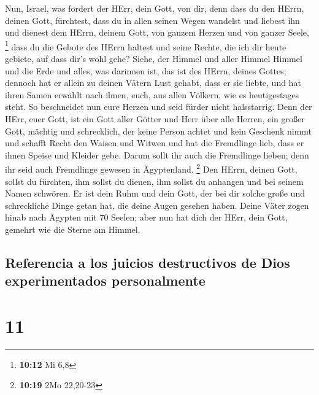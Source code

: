  Nun, Israel, was fordert der HErr, dein Gott, von dir,
denn dass du den HErrn, deinen Gott, fürchtest, dass du in allen seinen
Wegen wandelst und liebest ihn und dienest dem HErrn, deinem Gott, von
ganzem Herzen und von ganzer Seele, \footnote{\textbf{10:12} Mi 6,8}
 dass du die Gebote des HErrn haltest und seine Rechte,
die ich dir heute gebiete, auf dass dir's wohl gehe? 
Siehe, der Himmel und aller Himmel Himmel und die Erde und alles, was
darinnen ist, das ist des HErrn, deines Gottes;  dennoch
hat er allein zu deinen Vätern Lust gehabt, dass er sie liebte, und hat
ihren Samen erwählt nach ihnen, euch, aus allen Völkern, wie es
heutigestages steht.  So beschneidet nun eure Herzen und
seid fürder nicht halsstarrig.  Denn der HErr, euer Gott,
ist ein Gott aller Götter und Herr über alle Herren, ein großer Gott,
mächtig und schrecklich, der keine Person achtet und kein Geschenk nimmt
 und schafft Recht den Waisen und Witwen und hat die
Fremdlinge lieb, dass er ihnen Speise und Kleider gebe. 
Darum sollt ihr auch die Fremdlinge lieben; denn ihr seid auch
Fremdlinge gewesen in Ägyptenland. \footnote{\textbf{10:19} 2Mo 22,20-23}
 Den HErrn, deinen Gott, sollst du fürchten, ihm sollst
du dienen, ihm sollst du anhangen und bei seinem Namen schwören.
 Er ist dein Ruhm und dein Gott, der bei dir solche große
und schreckliche Dinge getan hat, die deine Augen gesehen haben.
 Deine Väter zogen hinab nach Ägypten mit 70 Seelen; aber
nun hat dich der HErr, dein Gott, gemehrt wie die Sterne am Himmel.

\hypertarget{referencia-a-los-juicios-destructivos-de-dios-experimentados-personalmente}{%
\subsection{Referencia a los juicios destructivos de Dios experimentados
personalmente}\label{referencia-a-los-juicios-destructivos-de-dios-experimentados-personalmente}}

\hypertarget{section-10}{%
\section{11}\label{section-10}}

